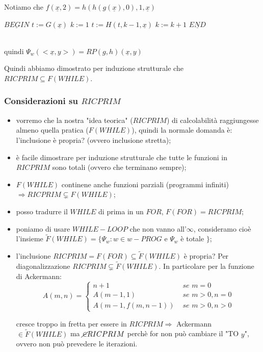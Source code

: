 \documentclass{article}
\begin{document}
\begin{itemize}
\begin{itemize}
    			Notiamo che $f(\underline{x},2)=h(h(g(\underline{x}),0),1,\underline{x})$
    			\begin{algorithm}
			\caption{$w \equiv$}
        \begin{algorithmic}[1]
        		 \State $\underline{BEGIN}$ 
        		 \State $t:=G(\underline{x})$
        		 \State $k:=1$
        		 	\State $t:=H(t,k-1,\underline{x})$
        		 	\State $k:=k+1$
        		 \EndWhile
        		 \State $\underline{END}$
        		 
        \end{algorithmic}
    \end{algorithm}
    \\
    			quindi $\Psi_w(<\underline{x},y>)=RP(g,h)(\underline{x},y)$
    			
		\end{itemize}
	
	
\end{itemize}
Quindi abbiamo dimostrato per induzione strutturale che $RICPRIM \subseteq F(WHILE)$.
\subsubsection{Considerazioni su $RICPRIM$}
\begin{itemize}
	\item vorremo che la nostra "idea teorica" ($RICPRIM$) di calcolabilità raggiungesse almeno quella pratica ($F(WHILE)$), quindi la normale domanda è: l'inclusione è propria? (ovvero inclusione stretta);
	\item è facile dimostrare per induzione strutturale che tutte le funzioni in $RICPRIM$ sono totali (ovvero che terminano sempre);
	\item $F(WHILE)$ continene anche funzioni parziali (programmi infiniti) $\Rightarrow RICPRIM \subsetneq F(WHILE)$;
	\item posso tradurre il $WHILE$ di prima in un $FOR$, $F(FOR)=RICPRIM$;
	\item poniamo di usare $WHILE-LOOP$ che non vanno all'$\infty$, consideramo cioè l'insieme $\tilde{F}(WHILE)=\{ \Psi_w:w \in w-PROG$ e $\Psi_w$ è totale $ \}$;
	\item l'inclusione $RICPRIM=F(FOR) \subseteq \tilde{F}(WHILE)$ è propria? Per diagonalizzazione $RICPRIM \subsetneq \tilde{F}(WHILE)$. In particolare per la funzione di Ackermann:
	\begin{displaymath}
	A(m,n)=
		\begin{cases}
			n+1 &\textit{ se } m=0 \\
			A(m-1,1) &\textit{ se } m>0,n=0 \\
			A(m-1,f(m,n-1)) &\textit{ se } m>0, n>0
		\end{cases}
\end{displaymath}		
	
	 cresce troppo in fretta per essere in $RICPRIM \Rightarrow$ Ackermann $\in \tilde{F}(WHILE)$ ma $\cancel{\in} RICPRIM$ perchè for non può cambiare il "TO $y$", ovvero non può prevedere le iterazioni.
\end{itemize}
\end{document}
